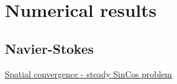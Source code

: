 \documentclass{beamer}
\begin{document}
\section{Numerical results}
\subsection*{Navier-Stokes}
\begin{frame}[label=spaceconv]{\hyperlink{spaceconvSupp}{Spatial convergence - 
steady SinCos problem}}
\begin{figure}
	\centering
\end{figure}
\end{frame}
\end{document}

